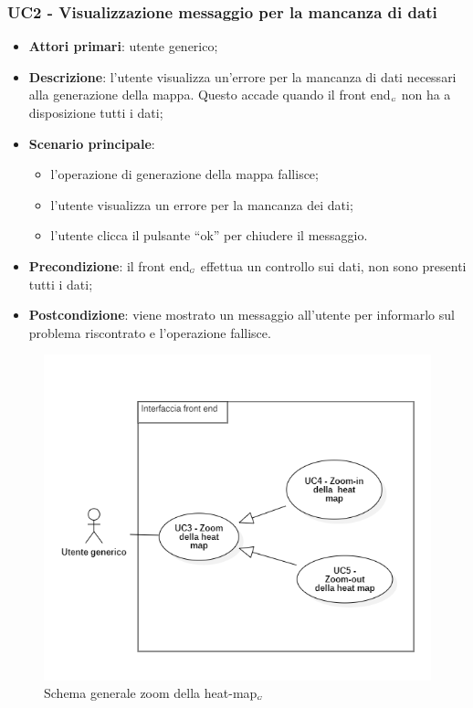 \subsubsection{UC2 - Visualizzazione messaggio per la mancanza di dati }\label{CasiDUsoCasiDUsoTraUnUtenteEIlFrontEndElencoCasiDUsoUC2VisualizzazioneMessaggioPerLaMancanzaDiDati} %
\begin{itemize}
	\item \textbf{Attori primari}: utente generico;
	\item \textbf{Descrizione}: l’utente visualizza un'errore per la mancanza di dati necessari alla generazione della mappa. Questo accade quando il front end$_{\scaleto{G}{3pt}}$ non ha a disposizione tutti i dati;
	\item \textbf{Scenario principale}:
	\begin{itemize}
		\item l’operazione di generazione della mappa fallisce;
		\item l’utente visualizza un errore per la mancanza dei dati;
		\item l’utente clicca il pulsante “ok” per chiudere il messaggio.
	\end{itemize}
	\item \textbf{Precondizione}: il front end$_{\scaleto{G}{3pt}}$ effettua un controllo sui dati, non sono presenti tutti i dati;
	\item \textbf{Postcondizione}: viene mostrato un messaggio all’utente per informarlo sul problema riscontrato e l’operazione fallisce.
\end{itemize}


\begin{center}
	\begin{figure}[H]
		\centering\includegraphics[scale=0.8]{../immagini/attori_casi/UC_3_4_5.png}
		\caption{Schema generale zoom della heat-map$_{\scaleto{G}{3pt}}$}
	\end{figure}
\end{center}


